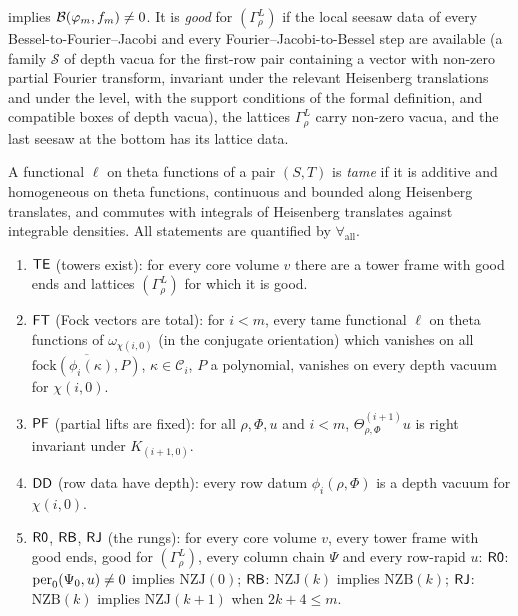 \begin{definition}
implies $\mathcal B(\varphi_m,f_m)\ne0$. It is \emph{good} for $(\Gamma^L_\rho)$ if the local seesaw data of every Bessel-to-Fourier--Jacobi and
every Fourier--Jacobi-to-Bessel step are available (a family $\mathcal S$ of depth vacua for the first-row pair containing a vector with
non-zero partial Fourier transform, invariant under the relevant Heisenberg translations and under the level, with the support
conditions of the formal definition, and compatible boxes of depth vacua), the lattices $\Gamma^L_\rho$ carry non-zero vacua, and the last
seesaw at the bottom has its lattice data.
\end{definition}

\begin{definition}\label{pf:fs:towerstatements}
A functional $\ell$ on theta functions of a pair $(S,T)$ is \emph{tame} if it is additive and homogeneous on theta functions,
continuous and bounded along Heisenberg translates, and commutes with integrals of Heisenberg translates against integrable
densities. All statements are quantified by $\forall_{\mathrm{all}}$.
\begin{enumerate}[label=(\arabic*)]
\item $\mathsf{TE}$ (towers exist): for every core volume $v$ there are a tower frame with good ends and lattices $(\Gamma^L_\rho)$ for which
it is good.
\item $\mathsf{FT}$ (Fock vectors are total): for $i<m$, every tame functional $\ell$ on theta functions of $\omega_{\chi(i,0)}$ (in the
conjugate orientation) which vanishes on all $\overline{\mathrm{fock}(\phi_i(\kappa),P)}$, $\kappa\in\mathcal C_i$, $P$ a polynomial,
vanishes on every depth vacuum for $\chi(i,0)$.
\item $\mathsf{PF}$ (partial lifts are fixed): for all $\rho,\Phi,u$ and $i<m$, $\Theta^{(i+1)}_{\rho,\Phi}u$ is right invariant under
$K_{(i+1,0)}$.
\item $\mathsf{DD}$ (row data have depth): every row datum $\phi_i(\rho,\Phi)$ is a depth vacuum for $\chi(i,0)$.
\item $\mathsf{R0}$, $\mathsf{RB}$, $\mathsf{RJ}$ (the rungs): for every core volume $v$, every tower frame with good ends, good for
$(\Gamma^L_\rho)$, every column chain $\Psi$ and every row-rapid $u$:
$\mathsf{R0}$: $\mathrm{per}_0(\Psi_0,u)\ne0$ implies $\mathrm{NZJ}(0)$;
$\mathsf{RB}$: $\mathrm{NZJ}(k)$ implies $\mathrm{NZB}(k)$;
$\mathsf{RJ}$: $\mathrm{NZB}(k)$ implies $\mathrm{NZJ}(k+1)$ when $2k+4\le m$.
\end{enumerate}
\end{definition}

